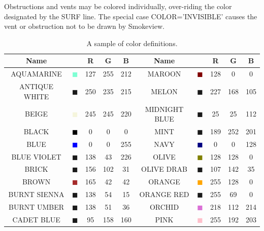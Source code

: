 \documentclass[11pt]{book}
\begin{document}
Obstructions and vents may be colored individually, over-riding the color designated by the {\ct SURF} line. The special case {\ct COLOR='INVISIBLE'} causes the vent or obstruction not to be drawn by Smokeview.


\begin{table}[p]
\begin{center}
\caption[A sample of color definitions]{A sample of color definitions.}
\label{tab:colors}
\vspace{0.1in}
\begin{tabular}{|c|c|c|c|c|c||c|c|c|c|}
\hline
Name & &  R  & G & B & Name & & R & G & B   \\ \hline \hline
{\ct AQUAMARINE} & \textcolor{AQUAMARINE} {$\blacksquare$} & 127& 255& 212& {\ct MAROON} &  \textcolor{MAROON} {$\blacksquare$} & 128& 0& 0  \\ \hline
{\ct ANTIQUE WHITE} & \textcolor{ANTIQUE WHITE} {$\blacksquare$} & 250& 235& 215& {\ct MELON} &  \textcolor{MELON} {$\blacksquare$} & 227& 168& 105  \\ \hline
{\ct BEIGE} & \textcolor{BEIGE} {$\blacksquare$} & 245& 245& 220& {\ct MIDNIGHT BLUE} &  \textcolor{MIDNIGHT BLUE} {$\blacksquare$} & 25& 25& 112  \\ \hline
{\ct BLACK} & \textcolor{BLACK} {$\blacksquare$} & 0& 0& 0& {\ct MINT} &  \textcolor{MINT} {$\blacksquare$} & 189& 252& 201  \\ \hline
{\ct BLUE} & \textcolor{BLUE} {$\blacksquare$} & 0& 0& 255& {\ct NAVY} &  \textcolor{NAVY} {$\blacksquare$} & 0& 0& 128  \\ \hline
{\ct BLUE VIOLET} & \textcolor{BLUE VIOLET} {$\blacksquare$} & 138& 43& 226& {\ct OLIVE} &  \textcolor{OLIVE} {$\blacksquare$} & 128& 128& 0  \\ \hline
{\ct BRICK} & \textcolor{BRICK} {$\blacksquare$} & 156& 102& 31& {\ct OLIVE DRAB} &  \textcolor{OLIVE DRAB} {$\blacksquare$} & 107& 142& 35  \\ \hline
{\ct BROWN} & \textcolor{BROWN} {$\blacksquare$} & 165& 42& 42& {\ct ORANGE} &  \textcolor{ORANGE} {$\blacksquare$} & 255& 128& 0  \\ \hline
{\ct BURNT SIENNA} & \textcolor{BURNT SIENNA} {$\blacksquare$} & 138& 54& 15& {\ct ORANGE RED} &  \textcolor{ORANGE RED} {$\blacksquare$} & 255& 69& 0  \\ \hline
{\ct BURNT UMBER} & \textcolor{BURNT UMBER} {$\blacksquare$} & 138& 51& 36& {\ct ORCHID} &  \textcolor{ORCHID} {$\blacksquare$} & 218& 112& 214  \\ \hline
{\ct CADET BLUE} & \textcolor{CADET BLUE} {$\blacksquare$} & 95& 158& 160& {\ct PINK} &  \textcolor{PINK} {$\blacksquare$} & 255& 192& 203  \\ \hline

\end{tabular}
\end{center}
\end{table}
\end{document}
